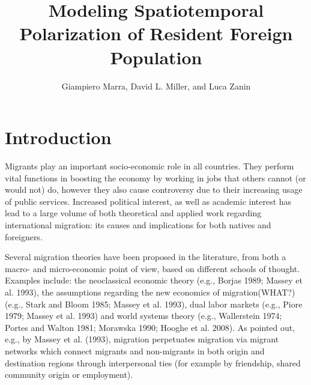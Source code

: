\documentclass[10pt] {article}
\theoremstyle{definition}
\theoremstyle{plain}
\begin{document}
\title{Modeling Spatiotemporal Polarization of Resident Foreign Population}

\author{Giampiero Marra, David L. Miller, and Luca Zanin
}

\maketitle








\section{Introduction \label{IN}}

Migrants play an important socio-economic role in all countries. They perform vital functions in boosting the economy by working in jobs that others cannot (or would not) do, however they also cause controversy due to their increasing usage of public services. Increased political interest, as well as academic interest has lead to a large volume of both theoretical and applied work regarding international migration: its causes and implications for both natives and foreigners.

Several migration theories have been proposed in the literature, from both a macro- and micro-economic point of view, based on different schools of thought. Examples include: the neoclassical economic theory (e.g., Borjas 1989; Massey et al. 1993), the assumptions regarding the new economics of migration(WHAT?) (e.g., Stark and Bloom 1985; Massey et al. 1993), dual labor markets (e.g., Piore 1979; Massey et al. 1993) and world systems theory (e.g., Wallerstein 1974; Portes and Walton 1981; Morawska 1990; Hooghe et al. 2008). As pointed out, e.g., by Massey et al. (1993), migration perpetuates migration via migrant networks which connect migrants and non-migrants in both origin and destination regions through interpersonal ties (for example by friendship, shared community origin or employment).
\end{document}
